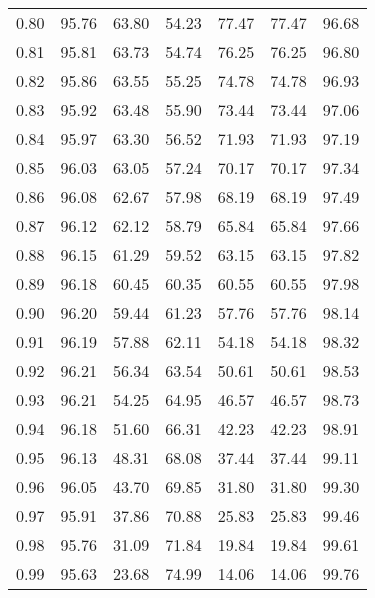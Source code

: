 \begin{tabular}{|c|c|c|c|c|c|c|}
      0.80 &     95.76 &     63.80 &      54.23 &   77.47 &      77.47 &         96.68 \\
      0.81 &     95.81 &     63.73 &      54.74 &   76.25 &      76.25 &         96.80 \\
      0.82 &     95.86 &     63.55 &      55.25 &   74.78 &      74.78 &         96.93 \\
      0.83 &     95.92 &     63.48 &      55.90 &   73.44 &      73.44 &         97.06 \\
      0.84 &     95.97 &     63.30 &      56.52 &   71.93 &      71.93 &         97.19 \\
      0.85 &     96.03 &     63.05 &      57.24 &   70.17 &      70.17 &         97.34 \\
      0.86 &     96.08 &     62.67 &      57.98 &   68.19 &      68.19 &         97.49 \\
      0.87 &     96.12 &     62.12 &      58.79 &   65.84 &      65.84 &         97.66 \\
      0.88 &     96.15 &     61.29 &      59.52 &   63.15 &      63.15 &         97.82 \\
      0.89 &     96.18 &     60.45 &      60.35 &   60.55 &      60.55 &         97.98 \\
      0.90 &     96.20 &     59.44 &      61.23 &   57.76 &      57.76 &         98.14 \\
      0.91 &     96.19 &     57.88 &      62.11 &   54.18 &      54.18 &         98.32 \\
      0.92 &     96.21 &     56.34 &      63.54 &   50.61 &      50.61 &         98.53 \\
      0.93 &     96.21 &     54.25 &      64.95 &   46.57 &      46.57 &         98.73 \\
      0.94 &     96.18 &     51.60 &      66.31 &   42.23 &      42.23 &         98.91 \\
      0.95 &     96.13 &     48.31 &      68.08 &   37.44 &      37.44 &         99.11 \\
      0.96 &     96.05 &     43.70 &      69.85 &   31.80 &      31.80 &         99.30 \\
      0.97 &     95.91 &     37.86 &      70.88 &   25.83 &      25.83 &         99.46 \\
      0.98 &     95.76 &     31.09 &      71.84 &   19.84 &      19.84 &         99.61 \\
      0.99 &     95.63 &     23.68 &      74.99 &   14.06 &      14.06 &         99.76 \\
\bottomrule
\end{tabular}
